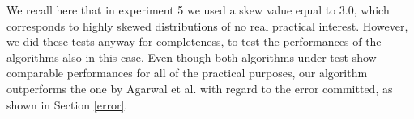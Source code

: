 \documentclass[final,3p,times]{elsarticle}
\begin{document}
We recall here that in experiment 5 we used a skew value equal to 3.0, which corresponds to highly skewed distributions of no real practical interest. However, we did these tests anyway for completeness, to test the performances of the algorithms also in this case. Even though both algorithms under test show comparable performances for all of the practical purposes, our algorithm outperforms the one by Agarwal et al. with regard to the error committed, as shown in Section \ref{error}.






\end{document}
